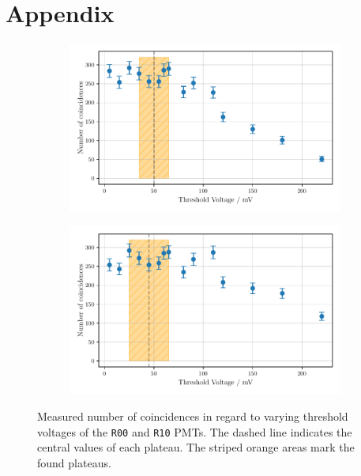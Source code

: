 \chapter{Appendix}
\label{sec:appendix}
\begin{figure}
    \centering
    \begin{subfigure}[b]{0.48\textwidth}
    \includegraphics[width=\textwidth]{plots/threshR00.pdf}
\end{subfigure}\hfill
\begin{subfigure}[b]{0.48\textwidth}
    \includegraphics[width=\textwidth]{plots/threshR10_2.pdf}
\end{subfigure}
\caption{Measured number of coincidences in regard to varying threshold voltages
of the \texttt{R00} and \texttt{R10} PMTs.
The dashed line indicates the central values of each plateau. The striped orange areas mark the found plateaus.}
\label{fig:appthresh1}
\end{figure}
